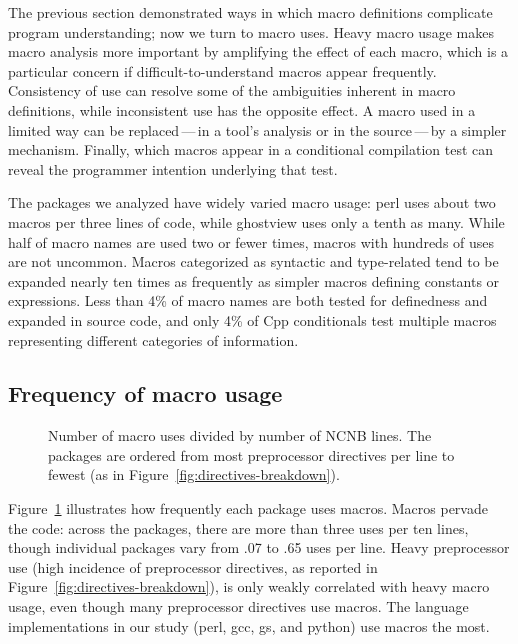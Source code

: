 \documentclass[10pt]{article}
\newcommand{\pkg}[1]{\textsf{#1}}
\newcommand{\captionsmall}[1]{\caption[]{\small #1}}
\begin{document}
The previous section demonstrated ways in which macro definitions
complicate program understanding; now we turn to macro uses.  Heavy macro
usage makes macro analysis more important by amplifying the effect of each
macro, which is a particular concern if difficult-to-understand macros
appear frequently.  Consistency of use can resolve some of the ambiguities
inherent in macro definitions, while inconsistent use has the opposite
effect.  A macro used in a limited way can be replaced\,---\,in a tool's
analysis or in the source\,---\,by a simpler mechanism.  Finally, which
macros appear in a conditional compilation test can reveal the programmer
intention underlying that test.

The packages we analyzed have widely varied macro usage: \pkg{perl} uses
about two macros per three lines of code, while \pkg{ghostview} uses only a
tenth as many.  While half of macro names are used two or fewer times,
macros with hundreds of uses are not uncommon.  Macros categorized as
syntactic and type-related tend to be expanded nearly ten times as
frequently as simpler macros defining constants or expressions.  Less than
4\% of macro names are both tested for definedness and expanded in source
code, and only 4\% of Cpp conditionals test multiple macros representing
different categories of information.


\subsection{Frequency of macro usage}

\begin{figure}
\centerline{}
\captionsmall{Number of macro uses divided by number of NCNB lines.
  The packages are ordered from most preprocessor directives per line to
  fewest (as in Figure~\ref{fig:directives-breakdown}).}
\label{fig:use-per-line}
\end{figure}

Figure~\ref{fig:use-per-line} illustrates how frequently each package uses
macros.  Macros pervade the code: across the packages, there are more than
three uses per ten lines, though individual packages vary from .07 to .65
uses per line.  Heavy preprocessor use (high incidence of preprocessor
directives, as reported in Figure~\ref{fig:directives-breakdown}), is only
weakly correlated with heavy macro usage, even though many preprocessor
directives use macros.  The language implementations in our study
(\pkg{perl}, \pkg{gcc}, \pkg{gs}, and \pkg{python}) use macros the most.
\end{document}
